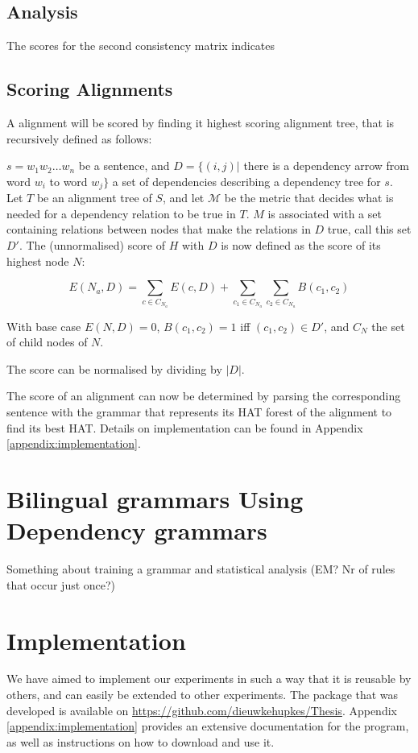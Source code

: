 \documentclass[hidelinks]{report}
\begin{document}
\subsection{Analysis}

The scores for the second consistency matrix indicates

\subsection{Scoring Alignments}

A alignment will be scored by finding it highest scoring alignment tree, that is recursively defined as follows:

\begin{definition}
 $s = w_1 w_2 \dots w_n$ be a sentence, and $D = \{ (i,j) |$ there is a dependency arrow from word $w_i$ to word $w_j \}$ a set of dependencies describing a dependency tree for $s$. Let $T$ be an alignment tree of $S$, and let $\mathcal{M}$ be the metric that decides what is needed for a dependency relation to be true in $T$. $M$ is associated with a set containing relations between nodes that make the relations in $D$ true, call this set $D'$. The (unnormalised) score of $H$ with $D$ is now defined as the score of its highest node $N$:

$$
E(N_a,D) = \sum_{c\in C_{N_a}} E(c,D)+ \sum_{c_1\in C_{N_a}} \sum_{c_2\in C_{N_a}} B(c_1,c_2)
$$

\noindent With base case $E(N,D) = 0$, $B(c_1,c_2) = 1$ iff  $(c_1,c_2)\in D'$, and $C_N$ the set of child nodes of $N$.

The score can be normalised by dividing by $|D|$.
\end{definition}

The score of an alignment can now be determined by parsing the corresponding sentence with the grammar that represents its HAT forest of the alignment to find its best HAT. Details on implementation can be found in Appendix \ref{appendix:implementation}.

\section{Bilingual grammars Using Dependency grammars}
\label{sec:em}

Something about training a grammar and statistical analysis (EM? Nr of rules that occur just once?)


\section{Implementation}
\label{sec:implementation}

We have aimed to implement our experiments in such a way that it is reusable by others, and can easily be extended to other experiments. The package that was developed is available on  \href{https://github.com/dieuwkehupkes/Thesis}{https://github.com/dieuwkehupkes/Thesis}. Appendix \ref{appendix:implementation} provides an extensive documentation for the program, as well as instructions on how to download and use it.


\end{document}

